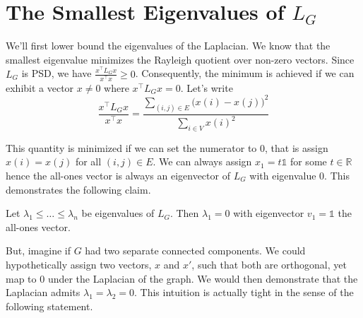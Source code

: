\section{The Smallest Eigenvalues of $L_G$}

We'll first lower bound the eigenvalues of the Laplacian. We know that the smallest eigenvalue minimizes the Rayleigh quotient over non-zero vectors. Since $L_G$ is PSD, we have $\frac{x^\top L_G x}{x^\top x} \geq 0$. Consequently, the minimum is achieved if we can exhibit a vector $x \neq 0$ where $x^\top L_G x = 0$. Let's write
\begin{equation*}
\frac{x^\top L_G x}{x^\top x}
= \frac{\sum_{(i, j) \in E} \big( x(i) - x(j) \big)^2 }{\sum_{i \in V} x(i)^2}
\end{equation*}

This quantity is minimized if we can set the numerator to 0, that is assign $x(i) = x(j)$ for all $(i, j) \in E$. We can always assign $x_1 = t \mathbb{1}$ for some $t \in \mathbb{R}$ hence the all-ones vector is always an eigenvector of $L_G$ with eigenvalue 0. This demonstrates the following claim.

\begin{claim}\label{claim:smallest-eigenvalue}
Let $\lambda_1 \leq \ldots \leq \lambda_n$ be eigenvalues of $L_G$. Then $\lambda_1 = 0$ with eigenvector $v_1 = \mathbb{1}$ the all-ones vector.
\end{claim}

But, imagine if $G$ had two separate connected components. We could hypothetically assign two vectors, $x$ and $x'$, such that both are orthogonal, yet map to 0 under the Laplacian of the graph. We would then demonstrate that the Laplacian admits $\lambda_1 = \lambda_2 = 0$. This intuition is actually tight in the sense of the following statement.

